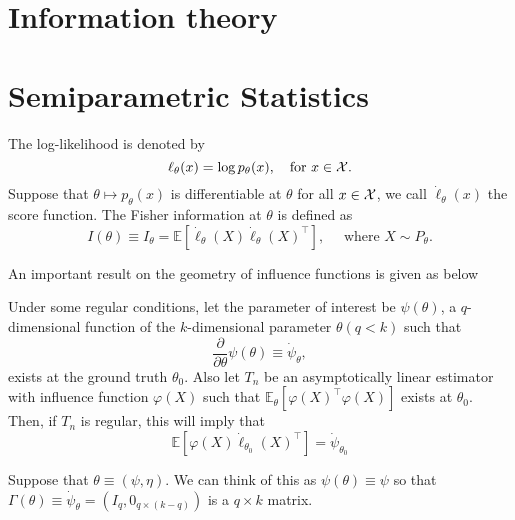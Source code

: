\section{Information theory}























\section{Semiparametric Statistics}

The log-likelihood is denoted by 
\begin{equation*}
    \ell_{\theta}(x) = \log p_{\theta}(x), \quad \text{for } x \in \mathcal{X}.
\end{equation*}
Suppose that $\theta \mapsto p_{\theta}(x)$ is differentiable at $\theta$ for all $x \in \mathcal{X}$, we call $\dot{\ell}_\theta(x)$ the score function. 
The Fisher information at $\theta$ is defined as 
$$
I(\theta) \equiv I_\theta=\mathbb{E}\left[\dot{\ell}_\theta(X) \dot{\ell}_\theta(X)^{\top}\right], \quad \text { where } X \sim P_\theta.
$$

An important result on the geometry of influence functions is given as below
\begin{theorem}
    Under some regular conditions, let the parameter of interest be $\psi(\theta)$, a $q$-dimensional function of the $k$-dimensional parameter $\theta (q < k)$ such that
    \begin{equation*}
        \frac{\partial}{\partial \theta} \psi(\theta) \equiv \dot{\psi}_\theta,
    \end{equation*}
    exists at the ground truth $\theta_0$. 
    Also let $T_n$ be an asymptotically linear estimator with influence function $\varphi(X)$ such that $\mathbb{E}_\theta\left[\varphi(X)^{\top} \varphi(X)\right]$ exists at $\theta_0$. Then, if $T_n$ is regular, this will imply that
$$
\mathbb{E}\left[\varphi(X) \dot{\ell}_{\theta_0}(X)^{\top}\right]=\dot{\psi}_{\theta_0}
$$
\end{theorem}
Suppose that $\theta \equiv (\psi, \eta)$. We can think of this as $\psi(\theta) \equiv \psi$ so that $\Gamma(\theta) \equiv \dot{\psi}_\theta=\left(I_q, 0_{q \times(k-q)}\right)$ is a $q \times k$ matrix.

